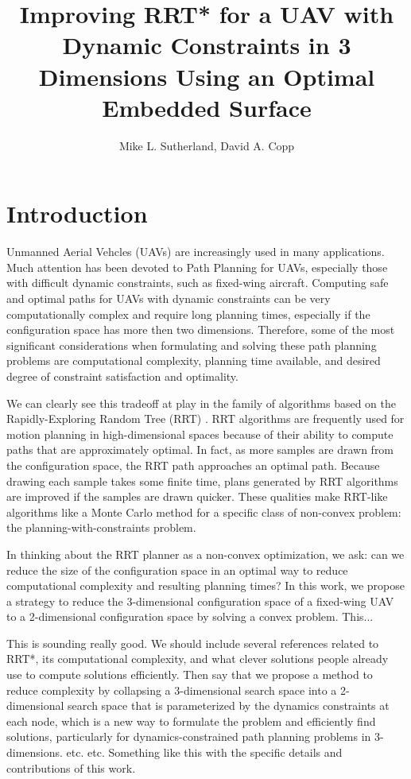 \documentclass[letterpaper, 12pt]{article}
\title{Improving RRT* for a UAV with Dynamic Constraints in 3 Dimensions Using an Optimal Embedded Surface}
\author{Mike L. Sutherland, David A. Copp}
\def\startmodif{\color{blue}}
\def\stopmodif{\color{black}\normalcolor}
\newcommand{\dac}[1]{\color{red}#1}
\begin{document}
\maketitle

\section{Introduction}
Unmanned Aerial Vehcles (UAVs) are increasingly used in many applications. Much attention has been devoted to Path Planning for UAVs, especially those with difficult dynamic constraints, such as fixed-wing aircraft. \startmodif Computing safe and optimal paths for UAVs with dynamic constraints can be very computationally complex and require long planning times, especially if the configuration space has more then two dimensions. Therefore, some of the most significant considerations when formulating and solving these path planning problems are computational complexity, planning time available, and desired degree of constraint satisfaction and optimality.\stopmodif 

We can clearly see this tradeoff at play in the family of algorithms based on the Rapidly-Exploring Random Tree (RRT) \cite{lavalle2006}. \startmodif RRT algorithms are frequently used for motion planning in high-dimensional spaces because of their ability \stopmodif to compute paths that are approximately optimal. In fact, as more samples are drawn from the configuration space, the RRT path approaches an optimal path. Because drawing each sample takes some finite time, plans generated by RRT algorithms are improved if the samples are drawn quicker. These qualities make RRT-like algorithms like a Monte Carlo method for a specific class of non-convex problem: the planning-with-constraints problem.

In thinking about the RRT planner as a non-convex optimization, we ask: can we reduce the size of the configuration space in an optimal way to \startmodif reduce computational complexity and resulting planning times? \stopmodif 
\startmodif In this work, we propose a strategy to reduce the 3-dimensional configuration space of a fixed-wing UAV to a 2-dimensional configuration space by solving a convex problem. \stopmodif This...

{\dac This is sounding really good. We should include several references related to RRT*, its computational complexity, and what clever solutions people already use to compute solutions efficiently. Then say that we propose a method to reduce complexity by collapsing a 3-dimensional search space into a 2-dimensional search space that is parameterized by the dynamics constraints at each node, which is a new way to formulate the problem and efficiently find solutions, particularly for dynamics-constrained path planning problems in 3-dimensions. etc. etc. Something like this with the specific details and contributions of this work.}
\end{document}
